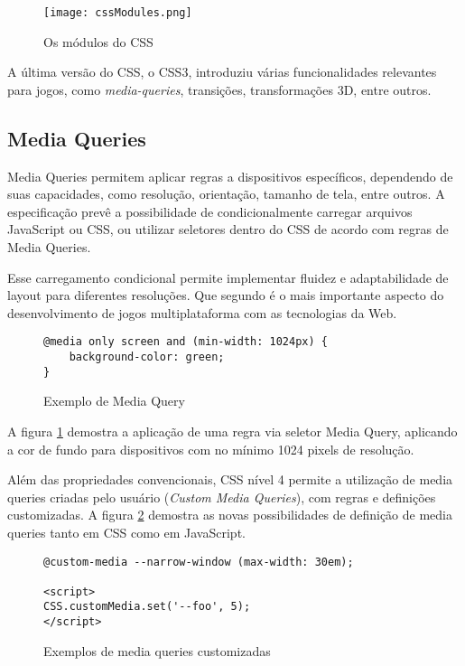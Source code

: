 \begin{figure}[H]
    \centering
    \texttt{[image: cssModules.png]}
    \caption{Os módulos do CSS}
\end{figure}

A última versão do CSS, o CSS3, introduziu várias funcionalidades
relevantes para jogos, como \textit{media-queries}, transições,
transformações 3D, entre outros.

\subsection{Media Queries}

Media Queries permitem aplicar regras a dispositivos específicos,
dependendo de suas capacidades, como resolução, orientação, tamanho
de tela, entre outros. A especificação prevê a possibilidade de
condicionalmente carregar arquivos JavaScript ou CSS, ou utilizar
seletores dentro do CSS de acordo com regras de Media Queries.

Esse carregamento condicional  permite implementar fluidez e
adaptabilidade de layout para diferentes resoluções. Que segundo
\citet{HTML5CrossPlatformGameDevelopment} é o mais importante aspecto do
desenvolvimento de jogos multiplataforma com as tecnologias da Web.

\begin{figure}[H]
\centering
\begin{verbatim}
@media only screen and (min-width: 1024px) {
    background-color: green;
}
\end{verbatim}
\caption{Exemplo de Media Query}
\label{fig:MediaQuery}
\end{figure}

A figura \ref{fig:MediaQuery} demostra a aplicação de uma regra
via seletor Media Query, aplicando a cor de fundo para dispositivos
com no mínimo 1024 pixels de resolução. 


Além das propriedades convencionais, CSS nível 4 permite a
utilização de media queries criadas pelo usuário (\textit{Custom
Media Queries}), com regras e definições customizadas. A figura
\ref{fig:MediaQueryCustom} demostra as novas possibilidades de
definição de media queries tanto em CSS como em JavaScript.

\begin{figure}[H]
\centering
\begin{verbatim}
@custom-media --narrow-window (max-width: 30em);

<script>
CSS.customMedia.set('--foo', 5);
</script>

\end{verbatim}
\caption{Exemplos de media queries customizadas}
\label{fig:MediaQueryCustom}
\end{figure}

